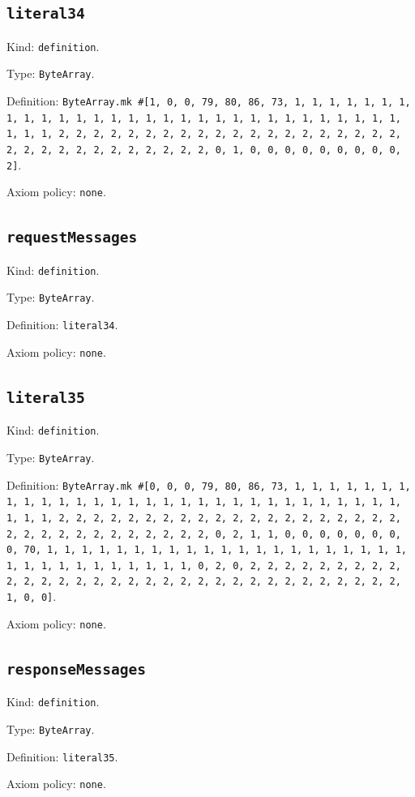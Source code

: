 \documentclass[11pt]{article}
\begin{document}
\subsection*{\texttt{literal34}}
\noindent Kind: \texttt{definition}.\par
\noindent Type: \texttt{ByteArray}.\par
\noindent Definition: \texttt{ByteArray.mk \#[1, 0, 0, 79, 80, 86, 73, 1, 1, 1, 1, 1, 1, 1, 1, 1, 1, 1, 1, 1, 1, 1, 1, 1, 1, 1, 1, 1, 1, 1, 1, 1, 1, 1, 1, 1, 1, 1, 1, 1, 2, 2, 2, 2, 2, 2, 2, 2, 2, 2, 2, 2, 2, 2, 2, 2, 2, 2, 2, 2, 2, 2, 2, 2, 2, 2, 2, 2, 2, 2, 2, 2, 0, 1, 0, 0, 0, 0, 0, 0, 0, 0, 0, 2]}.\par
\noindent Axiom policy: \texttt{none}.\par
\subsection*{\texttt{requestMessages}}
\noindent Kind: \texttt{definition}.\par
\noindent Type: \texttt{ByteArray}.\par
\noindent Definition: \texttt{literal34}.\par
\noindent Axiom policy: \texttt{none}.\par
\subsection*{\texttt{literal35}}
\noindent Kind: \texttt{definition}.\par
\noindent Type: \texttt{ByteArray}.\par
\noindent Definition: \texttt{ByteArray.mk \#[0, 0, 0, 79, 80, 86, 73, 1, 1, 1, 1, 1, 1, 1, 1, 1, 1, 1, 1, 1, 1, 1, 1, 1, 1, 1, 1, 1, 1, 1, 1, 1, 1, 1, 1, 1, 1, 1, 1, 1, 2, 2, 2, 2, 2, 2, 2, 2, 2, 2, 2, 2, 2, 2, 2, 2, 2, 2, 2, 2, 2, 2, 2, 2, 2, 2, 2, 2, 2, 2, 2, 2, 0, 2, 1, 1, 0, 0, 0, 0, 0, 0, 0, 0, 70, 1, 1, 1, 1, 1, 1, 1, 1, 1, 1, 1, 1, 1, 1, 1, 1, 1, 1, 1, 1, 1, 1, 1, 1, 1, 1, 1, 1, 1, 1, 1, 1, 0, 2, 0, 2, 2, 2, 2, 2, 2, 2, 2, 2, 2, 2, 2, 2, 2, 2, 2, 2, 2, 2, 2, 2, 2, 2, 2, 2, 2, 2, 2, 2, 2, 2, 2, 1, 0, 0]}.\par
\noindent Axiom policy: \texttt{none}.\par
\subsection*{\texttt{responseMessages}}
\noindent Kind: \texttt{definition}.\par
\noindent Type: \texttt{ByteArray}.\par
\noindent Definition: \texttt{literal35}.\par
\noindent Axiom policy: \texttt{none}.\par
\end{document}

